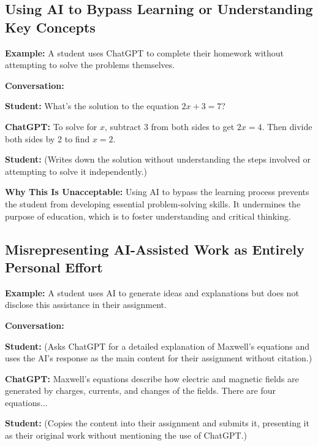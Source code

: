 \documentclass{article}
\begin{document}
\subsection{Using AI to Bypass Learning or Understanding Key Concepts}

\textbf{Example:} A student uses ChatGPT to complete their homework without attempting to solve the problems themselves.

\textbf{Conversation:}
\begin{mdframed}
\begin{flushleft}
\textbf{Student:} What’s the solution to the equation \(2x + 3 = 7\)?

\textbf{ChatGPT:} To solve for \(x\), subtract 3 from both sides to get \(2x = 4\). Then divide both sides by 2 to find \(x = 2\).

\textbf{Student:} (Writes down the solution without understanding the steps involved or attempting to solve it independently.)
\end{flushleft}
\end{mdframed}

\textbf{Why This Is Unacceptable:} Using AI to bypass the learning process prevents the student from developing essential problem-solving skills. It undermines the purpose of education, which is to foster understanding and critical thinking.

\subsection{Misrepresenting AI-Assisted Work as Entirely Personal Effort}

\textbf{Example:} A student uses AI to generate ideas and explanations but does not disclose this assistance in their assignment.

\textbf{Conversation:}
\begin{mdframed}
\begin{flushleft}
\textbf{Student:} (Asks ChatGPT for a detailed explanation of Maxwell’s equations and uses the AI’s response as the main content for their assignment without citation.)

\textbf{ChatGPT:} Maxwell’s equations describe how electric and magnetic fields are generated by charges, currents, and changes of the fields. There are four equations...

\textbf{Student:} (Copies the content into their assignment and submits it, presenting it as their original work without mentioning the use of ChatGPT.)
\end{flushleft}
\end{mdframed}
\end{document}

